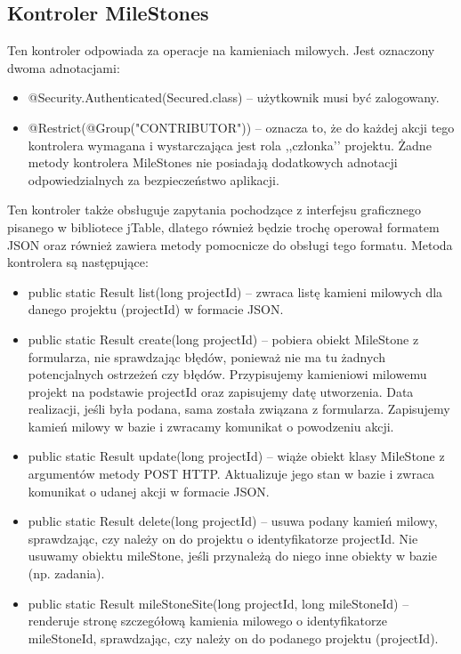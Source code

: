 \documentclass[a4paper,12pt,notitlepage]{mwrep}
\begin{document}
\subsection{Kontroler MileStones}
Ten kontroler odpowiada za operacje na kamieniach milowych. Jest oznaczony dwoma adnotacjami:
\begin{itemize}
\item    @Security.Authenticated(Secured.class) -- użytkownik musi być zalogowany.
\item    @Restrict(@Group("CONTRIBUTOR")) -- oznacza to, że do każdej akcji tego
    kontrolera wymagana i wystarczająca jest rola ,,członka’’ projektu. Żadne metody
    kontrolera MileStones nie posiadają dodatkowych adnotacji odpowiedzialnych
    za bezpieczeństwo aplikacji.
\end{itemize}
Ten kontroler także obsługuje zapytania pochodzące z interfejsu graficznego pisanego
w bibliotece jTable, dlatego również będzie trochę operował formatem JSON oraz również
zawiera metody pomocnicze do obsługi tego formatu. Metoda kontrolera są następujące:
\begin{itemize}
    \item    public static Result list(long projectId) -- zwraca listę kamieni milowych dla
        danego projektu (projectId) w formacie JSON.
    \item    public static Result create(long projectId) -- pobiera obiekt MileStone z
formularza, nie sprawdzając błędów, ponieważ nie ma tu żadnych
potencjalnych ostrzeżeń czy błędów. Przypisujemy kamieniowi milowemu
projekt na podstawie projectId oraz zapisujemy datę utworzenia. Data
realizacji, jeśli była podana, sama została związana z formularza. Zapisujemy
kamień milowy w bazie i zwracamy komunikat o powodzeniu akcji.
\item    public static Result update(long projectId) -- wiąże obiekt klasy MileStone z
    argumentów metody POST HTTP. Aktualizuje jego stan w bazie i zwraca
    komunikat o udanej akcji w formacie JSON.
\item    public static Result delete(long projectId) -- usuwa podany kamień milowy,
sprawdzając, czy należy on do projektu o identyfikatorze projectId. Nie usuwamy
obiektu mileStone, jeśli przynależą do niego inne obiekty w bazie (np. zadania).
\item    public static Result mileStoneSite(long projectId, long mileStoneId) -- renderuje
    stronę szczegółową kamienia milowego o identyfikatorze mileStoneId,
sprawdzając, czy należy on do podanego projektu (projectId).
\end{itemize}
\end{document}
